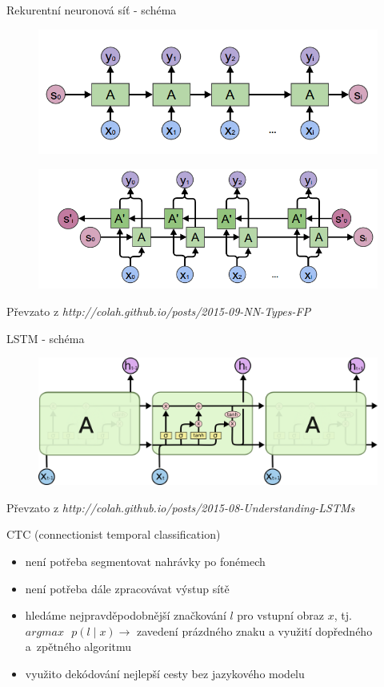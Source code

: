 \documentclass[10pt]{beamer}
\begin{document}
\begin{frame}{Rekurentní neuronová síť - schéma}
	\begin{figure}
		\includegraphics[width= 0.8\linewidth]{rnn_general.png}
	\end{figure}
	
	\begin{figure}
		\includegraphics[width= 0.8\linewidth]{rnn_bidirectional.png}
	\end{figure}
	
	Převzato z \textit{http://colah.github.io/posts/2015-09-NN-Types-FP}
\end{frame}

\begin{frame}{LSTM - schéma}
	\begin{figure}
		\includegraphics[width= 0.8\linewidth]{lstm.png}
	\end{figure}
	
	\centering	
	Převzato z \textit{http://colah.github.io/posts/2015-08-Understanding-LSTMs}
\end{frame}

\begin{frame}{CTC (connectionist temporal classification)}
	\begin{itemize}
		\item není potřeba segmentovat nahrávky po fonémech
		\item není potřeba dále zpracovávat výstup sítě
		\item hledáme nejpravděpodobnější značkování $ l $ pro vstupní obraz $ x $, tj. $ argmax \text{ } p(l \mid x) \rightarrow $ zavedení prázdného znaku a využití dopředného a~zpětného algoritmu 
		\item využito dekódování nejlepší cesty bez jazykového modelu
	\end{itemize}
\end{frame}
\end{document}
